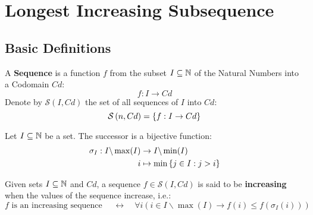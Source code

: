 \newcommand{\SetDiff}[2]{#1 \backslash #2}

\newcommand{\sequence}[2]{\ensuremath{\mathcal{S}\left( #1, #2 \right)}}
\newcommand{\subsequenceSet}[1]{\ensuremath{\mathfrak{s}\left(#1\right)}}
\newcommand{\subsequenceOf}[2]{\ensuremath{#1 \preceq #2}}
\newcommand{\subsequenceDomain}[1]{\ensuremath{\mathfrak{d}\left(#1\right)}}
\newcommand{\successorF}[1]{\ensuremath{\sigma_{#1}}}
\newcommand{\successor}[2]{\ensuremath{\successorF{#2}\left( #1 \right)}}
\newcommand{\length}[1]{\ensuremath{\mathfrak{L}\left(#1\right)}}
\newcommand{\increasingSubsequence}[1]{\ensuremath{\mathcal{I}\left(#1\right)}}
\newcommand{\ArgMax}[2]{\argmax\limits_{#1} \ #2}

\chapter{Longest Increasing Subsequence}

\section{Basic Definitions}

\begin{defn}[Sequence]
    A \textbf{Sequence} is a function $f$ from the subset $I \subseteq \mathbb{N}$ of the Natural Numbers into a Codomain $Cd$:
    \begin{equation}
        f: I \rightarrow Cd
    \end{equation}
    Denote by $\sequence{I}{Cd}$ the set of all sequences of $I$ into $Cd$:
    \begin{equation}
        \sequence{n}{Cd} = \Set{f: I \rightarrow Cd}
    \end{equation}
\end{defn}

\begin{defn}[Successor]
    Let $I \subseteq \mathbb{N}$ be a set. The successor is a bijective function:
    \begin{align}
        \successorF{I}: \SetDiff{I}{\max(I)} & \rightarrow \SetDiff{I}{\min(I)} \\
        i & \mapsto \min\SetOf{j \in I}{j > i}
    \end{align}
\end{defn}

\begin{defn}
    Given sets $I \subseteq \mathbb{N}$ and $Cd$, a sequence $f \in \sequence{I}{Cd}$ is said to be \textbf{increasing} when the values of the sequence increase, i.e.:
    \begin{equation}
        \mbox{$f$ is an increasing sequence }
        \quad \leftrightarrow \quad
        \forall i \left(
            i \in \SetDiff{I}{\max(I)}
            \rightarrow
            f(i) \leqslant f(\successor{i}{I})
        \right)
    \end{equation}
\end{defn}

